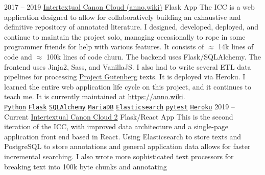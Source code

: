 \documentclass[9pt]{developercv} %
\begin{document}


\begin{entrylist}
    \entry
        {2017 -- 2019}
        {{\href{https://github.com/Anno-Wiki/icc}{Intertextual Canon Cloud (anno.wiki)}}}
        {Flask App}
        {
            The ICC is a web application designed to allow for collaboratively
            building an exhaustive and definitive repository of annotated
            literature. I designed, developed, deployed, and continue to
            maintain the project solo, managing occasionally to rope in some
            programmer friends for help with various features. It consists of
            $\approx$ 14k lines of code and $\approx$ 100k lines of code churn.
            The backend uses Flask/SQLAlchemy. The frontend uses Jinja2, Sass,
            and VanillaJS. I also had to write several ETL data pipelines for
            processing {\href{https://gutenberg.org}{Project Gutenberg}} texts.
            It is deployed via Heroku. I learned the entire web application life
            cycle on this project, and it continues to teach me. It is currently
            maintained at {\href{https://anno.wiki}{https://anno.wiki}}.
        \\
        \texttt{{\href{https://www.python.org/}{Python}}}\slashsep
        \texttt{{\href{https://flask.palletsprojects.com/en/1.1.x/}{Flask}}}\slashsep
        \texttt{{\href{https://www.sqlalchemy.org/}{SQLAlchemy}}}\slashsep
        \texttt{{\href{https://mariadb.org/}{MariaDB}}}\slashsep
        \texttt{{\href{https://www.elastic.co/}{Elasticsearch}}}\slashsep
        \texttt{{\href{https://docs.pytest.org/en/stable/}{pytest}}}\slashsep
        \texttt{{\href{https://www.heroku.com/}{Heroku}}}
        }
    \entry
        {2019 -- Current}
        {{\href{https://github.com/Anno-Wiki}{Intertextual Canon Cloud 2}}}
        {Flask/React App}
        {
            This is the second iteration of the ICC, with improved data
            architecture and a single-page application front end based in React.
            Using Elasticsearch to store texts and PostgreSQL to store
            annotations and general application data allows for faster
            incremental searching. I also wrote more sophisticated text
            processors for breaking text into 100k byte chunks and annotating
}
\end{entrylist}
\end{document}
